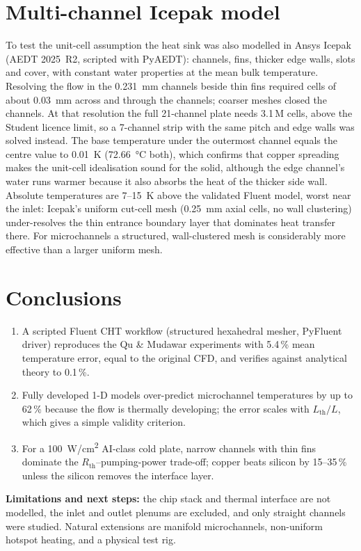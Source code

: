 \documentclass[10pt,a4paper]{article}
\begin{document}
\section{Multi-channel Icepak model}
To test the unit-cell assumption the heat sink was also modelled in Ansys Icepak (AEDT 2025~R2, scripted with PyAEDT): channels, fins, thicker edge walls, slots and cover, with constant water properties at the mean bulk temperature. Resolving the flow in the \SI{0.231}{mm} channels beside thin fins required cells of about \SI{0.03}{mm} across and through the channels; coarser meshes closed the channels. At that resolution the full 21-channel plate needs 3.1\,M cells, above the Student licence limit, so a 7-channel strip with the same pitch and edge walls was solved instead. The base temperature under the outermost channel equals the centre value to \SI{0.01}{K} (\SI{72.66}{\celsius} both), which confirms that copper spreading makes the unit-cell idealisation sound for the solid, although the edge channel's water runs warmer because it also absorbs the heat of the thicker side wall. Absolute temperatures are 7--\SI{15}{K} above the validated Fluent model, worst near the inlet: Icepak's uniform cut-cell mesh (\SI{0.25}{mm} axial cells, no wall clustering) under-resolves the thin entrance boundary layer that dominates heat transfer there. For microchannels a structured, wall-clustered mesh is considerably more effective than a larger uniform mesh.

\section{Conclusions}
\begin{enumerate}\setlength\itemsep{1pt}
\item A scripted Fluent CHT workflow (structured hexahedral mesher, PyFluent driver) reproduces the Qu \& Mudawar experiments with 5.4\,\% mean temperature error, equal to the original CFD, and verifies against analytical theory to 0.1\,\%.
\item Fully developed 1-D models over-predict microchannel temperatures by up to 62\,\% because the flow is thermally developing; the error scales with $L_\mathrm{th}/L$, which gives a simple validity criterion.
\item For a \SI{100}{W/cm^2} AI-class cold plate, narrow channels with thin fins dominate the $R_\mathrm{th}$--pumping-power trade-off; copper beats silicon by 15--35\,\% unless the silicon removes the interface layer.
\end{enumerate}
\textbf{Limitations and next steps:} the chip stack and thermal interface are not modelled, the inlet and outlet plenums are excluded, and only straight channels were studied. Natural extensions are manifold microchannels, non-uniform hotspot heating, and a physical test rig.
\end{document}
